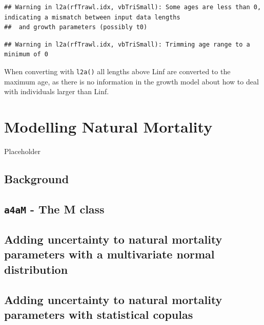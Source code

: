 \documentclass[
]{book}
\begin{document}
\begin{verbatim}
## Warning in l2a(rfTrawl.idx, vbTriSmall): Some ages are less than 0, indicating a mismatch between input data lengths
##  and growth parameters (possibly t0)
\end{verbatim}

\begin{verbatim}
## Warning in l2a(rfTrawl.idx, vbTriSmall): Trimming age range to a minimum of 0
\end{verbatim}

When converting with \texttt{l2a()} all lengths above Linf are converted to the maximum age, as there is no information in the growth model about how to deal with individuals larger than Linf.

\hypertarget{modelling-natural-mortality}{%
\chapter{Modelling Natural Mortality}\label{modelling-natural-mortality}}

Placeholder

\hypertarget{background}{%
\section{Background}\label{background}}

\hypertarget{a4am---the-m-class}{%
\section{\texorpdfstring{\texttt{a4aM} - The M class}{a4aM - The M class}}\label{a4am---the-m-class}}

\hypertarget{adding-uncertainty-to-natural-mortality-parameters-with-a-multivariate-normal-distribution}{%
\section{Adding uncertainty to natural mortality parameters with a multivariate normal distribution}\label{adding-uncertainty-to-natural-mortality-parameters-with-a-multivariate-normal-distribution}}

\hypertarget{adding-uncertainty-to-natural-mortality-parameters-with-statistical-copulas}{%
\section{Adding uncertainty to natural mortality parameters with statistical copulas}\label{adding-uncertainty-to-natural-mortality-parameters-with-statistical-copulas}}
\end{document}
